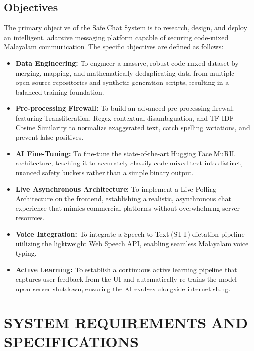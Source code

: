 \documentclass[12pt,a4paper]{report}
\begin{document}
\section{Objectives}
The primary objective of the Safe Chat System is to research, design, and deploy an intelligent, adaptive messaging platform capable of securing code-mixed Malayalam communication. The specific objectives are defined as follows:
\begin{itemize}
    \item \textbf{Data Engineering:} To engineer a massive, robust code-mixed dataset by merging, mapping, and mathematically deduplicating data from multiple open-source repositories and synthetic generation scripts, resulting in a balanced training foundation.
    \item \textbf{Pre-processing Firewall:} To build an advanced pre-processing firewall featuring Transliteration, Regex contextual disambiguation, and TF-IDF Cosine Similarity to normalize exaggerated text, catch spelling variations, and prevent false positives.
    \item \textbf{AI Fine-Tuning:} To fine-tune the state-of-the-art Hugging Face MuRIL architecture, teaching it to accurately classify code-mixed text into distinct, nuanced safety buckets rather than a simple binary output.
    \item \textbf{Live Asynchronous Architecture:} To implement a Live Polling Architecture on the frontend, establishing a realistic, asynchronous chat experience that mimics commercial platforms without overwhelming server resources.
    \item \textbf{Voice Integration:} To integrate a Speech-to-Text (STT) dictation pipeline utilizing the lightweight Web Speech API, enabling seamless Malayalam voice typing.
    \item \textbf{Active Learning:} To establish a continuous active learning pipeline that captures user feedback from the UI and automatically re-trains the model upon server shutdown, ensuring the AI evolves alongside internet slang.
\end{itemize}

\chapter{SYSTEM REQUIREMENTS AND SPECIFICATIONS}
\end{document}
